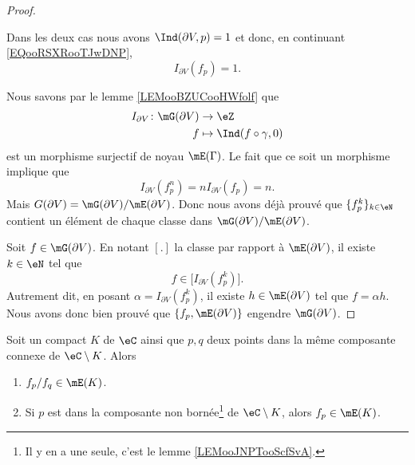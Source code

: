 \begin{proof}
\begin{subproof}
	\end{subproof}
	Dans les deux cas nous avons \( \Ind(\partial V, p)=1\) et donc, en continuant \eqref{EQooRSXRooTJwDNP},
	\begin{equation}
		I_{\partial V}(f_p)=1.
	\end{equation}

	Nous savons par le lemme \ref{LEMooBZUCooHWfolf} que
	\begin{equation}
		\begin{aligned}
			I_{\partial V}\colon \mG(\partial V) & \to \eZ                       \\
			f                                    & \mapsto \Ind(f\circ \gamma,0)
		\end{aligned}
	\end{equation}
	est un morphisme surjectif de noyau \( \mE(\Gamma)\). Le fait que ce soit un morphisme implique que
	\begin{equation}
		I_{\partial V}(f_p^n)=nI_{\partial V}(f_p)=n.
	\end{equation}
	Mais \( G(\partial V)=\mG(\partial V)/\mE(\partial V)\). Donc nous avons déjà prouvé que \( \{ f_p^k \}_{k\in \eN}\) contient un élément de chaque classe dans \( \mG(\partial V)/\mE(\partial V)\).

	Soit \( f\in \mG(\partial V)\). En notant \( [.]\) la classe par rapport à \( \mE(\partial V)\), il existe \( k\in \eN\) tel que
	\begin{equation}
		f\in\big[ I_{\partial V}(f_p^k) \big].
	\end{equation}
	Autrement dit, en posant \( \alpha=I_{\partial V}(f_p^k)\), il existe \( h\in \mE(\partial V)\) tel que \( f=\alpha h\). Nous avons donc bien prouvé que \( \{ f_p,\mE(\partial V) \}\) engendre \( \mG(\partial V)\).
\end{proof}

\begin{proposition}       \label{PROPooJNZQooLWDKww}
	Soit un compact \( K\) de \( \eC\) ainsi que \( p,q\) deux points dans la même composante connexe de \( \eC\setminus K\). Alors
	\begin{enumerate}
		\item       \label{ITEMooQMKOooQHhUGn}
		      \( f_p/f_q\in\mE(K)\).
		\item       \label{ITEMooUJLPooApgXIF}
		      Si \( p\) est dans la composante non bornée\footnote{Il y en a une seule, c'est le lemme \ref{LEMooJNPTooScfSvA}.} de \( \eC\setminus K\), alors \( f_p\in\mE(K)\).
	\end{enumerate}
\end{proposition}

